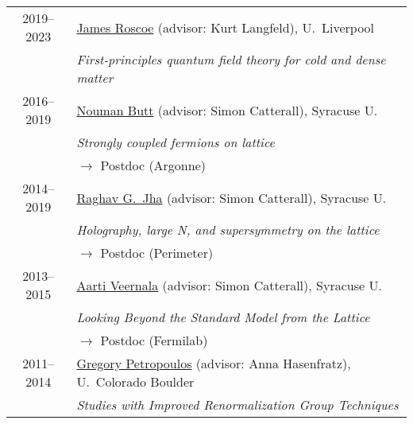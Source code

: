 \documentclass[10 pt]{article}
\newcommand{\lra}{\ensuremath{\longrightarrow} }
\begin{document}
\vspace{-12 pt} %
\begin{tabular}[t]{cl}
  2019--2023    & \href{https://inspirehep.net/author/profile/J.Roscoe.1}{James Roscoe} (advisor: Kurt Langfeld), U.~Liverpool                      \\
                & \textit{First-principles quantum field theory for cold and dense matter}                                                          \\[6 pt]
  2016--2019    & \href{https://inspirehep.net/author/profile/N.Butt.1}{Nouman Butt} (advisor: Simon Catterall), Syracuse U.                        \\
                & \textit{Strongly coupled fermions on lattice}                                                                                     \\
                & \qquad \lra Postdoc (Argonne)                                                                                                     \\[6 pt]
  2014--2019    & \href{https://rgjha.github.io}{Raghav G.~Jha} (advisor: Simon Catterall), Syracuse U.                     \\
                & \textit{Holography, large N, and supersymmetry on the lattice}                                                                    \\
                & \qquad \lra Postdoc (Perimeter)                                                                                                   \\[6 pt]
  2013--2015    & \href{https://inspirehep.net/author/profile/A.Veernala.1}{Aarti Veernala} (advisor: Simon Catterall), Syracuse U.                 \\
                & \textit{Looking Beyond the Standard Model from the Lattice}                                                                       \\
                & \qquad \lra Postdoc (Fermilab)                                                                                                    \\[6 pt]
  2011--2014    & \href{https://inspirehep.net/literature?q=a G.Petropoulos.2}{Gregory Petropoulos} (advisor: Anna Hasenfratz), U.~Colorado Boulder \\
                & \textit{Studies with Improved Renormalization Group Techniques}                                                                   \\

\end{tabular}
\end{document}
